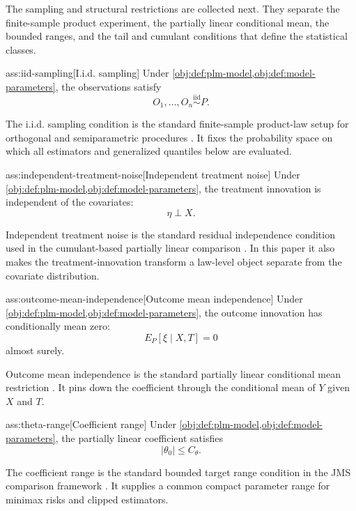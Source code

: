 The sampling and structural restrictions are collected next. They separate the finite-sample product experiment, the partially linear conditional mean, the bounded ranges, and the tail and cumulant conditions that define the statistical classes.

\begin{assumptionv}{ass:iid-sampling}[I.i.d. sampling]
Under \cref{obj:def:plm-model,obj:def:model-parameters}, the observations satisfy
\[
O_1,\ldots,O_n \stackrel{\mathrm{iid}}{\sim} P .
\]
\end{assumptionv}

The i.i.d. sampling condition is the standard finite-sample product-law setup for orthogonal and semiparametric procedures \citep{ChernozhukovEtAl2018DML}. It fixes the probability space on which all estimators and generalized quantiles below are evaluated.

\begin{assumptionv}{ass:independent-treatment-noise}[Independent treatment noise]
Under \cref{obj:def:plm-model,obj:def:model-parameters}, the treatment innovation is independent of the covariates:
\[
\eta \perp X .
\]
\end{assumptionv}

Independent treatment noise is the standard residual independence condition used in the cumulant-based partially linear comparison \citep{JinMackeySyrgkanis2025}. In this paper it also makes the treatment-innovation transform a law-level object separate from the covariate distribution.

\begin{assumptionv}{ass:outcome-mean-independence}[Outcome mean independence]
Under \cref{obj:def:plm-model,obj:def:model-parameters}, the outcome innovation has conditionally mean zero:
\[
E_P[\xi \mid X,T]=0
\]
almost surely.
\end{assumptionv}

Outcome mean independence is the standard partially linear conditional mean restriction \citep{Robinson1988}. It pins down the coefficient through the conditional mean of \(Y\) given \(X\) and \(T\).

\begin{assumptionv}{ass:theta-range}[Coefficient range]
Under \cref{obj:def:plm-model,obj:def:model-parameters}, the partially linear coefficient satisfies
\[
|\theta_0|\le C_{\theta}.
\]
\end{assumptionv}

The coefficient range is the standard bounded target range condition in the JMS comparison framework \citep{JinMackeySyrgkanis2025}. It supplies a common compact parameter range for minimax risks and clipped estimators.

